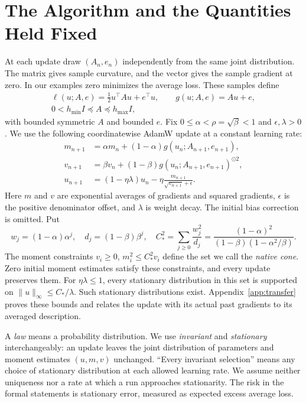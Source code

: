 \section{The Algorithm and the Quantities Held Fixed}
At each update draw $(A_n,e_n)$ independently from the same joint
distribution. The matrix gives sample curvature, and the vector gives
the sample gradient at zero. In our examples zero minimizes the average
loss. These samples define
\[
 \begin{gathered}
 \ell(u;A,e)=\tfrac12u^\top Au+e^\top u,\qquad g(u;A,e)=Au+e,\\
 0<h_{\min}I\preceq A\preceq h_{\max}I,
 \end{gathered}
\]
with bounded symmetric $A$ and bounded $e$. Fix
$0\leq\alpha<\rho=\sqrt\beta<1$ and $\epsilon,\lambda>0$.
We use the following coordinatewise AdamW update at a constant learning rate:
\begin{align}
 m_{n+1}&=\alpha m_n+(1-\alpha)g(u_n;A_{n+1},e_{n+1}),\nonumber\\
 v_{n+1}&=\beta v_n+(1-\beta)g(u_n;A_{n+1},e_{n+1})^{\odot2},
 \label{eq:native}\\
 u_{n+1}&=(1-\eta\lambda)u_n
                -\eta\frac{m_{n+1}}{\sqrt{v_{n+1}}+\epsilon}.
 \nonumber
\end{align}
Here $m$ and $v$ are exponential averages of gradients and squared gradients,
$\epsilon$ is the positive denominator offset, and $\lambda$ is weight
decay. The initial bias correction is omitted. Put
\[
 w_j=(1-\alpha)\alpha^j,\quad d_j=(1-\beta)\beta^j,\quad
 C_*^2=\sum_{j\geq0}\frac{w_j^2}{d_j}
 =\frac{(1-\alpha)^2}{(1-\beta)(1-\alpha^2/\beta)}.
\]
The moment constraints $v_i\geq0$, $m_i^2\leq C_*^2v_i$ define the set
we call the \emph{native cone}. Zero initial moment estimates satisfy these
constraints, and every update preserves them. For $\eta\lambda\leq1$,
every stationary distribution in this set is supported on
$\|u\|_\infty\leq C_*/\lambda$. Such stationary distributions exist.
Appendix~\ref{app:transfer} proves these bounds and relates the update with
its actual past gradients to its averaged description.

A \emph{law} means a probability distribution. We use \emph{invariant}
and \emph{stationary} interchangeably: an update leaves the joint
distribution of parameters and moment estimates $(u,m,v)$ unchanged.
``Every invariant selection'' means any choice of stationary
distribution at each allowed learning rate. We assume neither uniqueness
nor a rate at which a run approaches stationarity. The risk in the formal
statements is stationary error, measured as expected excess average loss.

